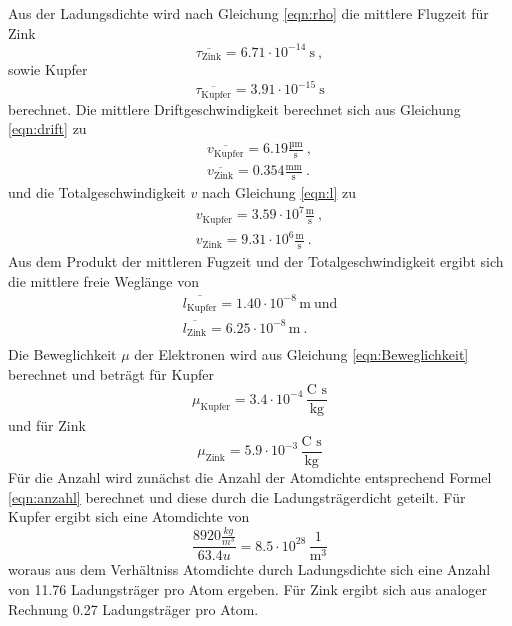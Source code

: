 Aus der Ladungsdichte wird nach Gleichung \ref{eqn:rho} die mittlere Flugzeit für Zink
\begin{equation}
  \overline{\tau_\text{Zink}} = 6.71 \cdot 10^{-14} \ \text{s} \ ,
  \label{eqn:tZ}
\end{equation}
sowie Kupfer
\begin{equation}
  \overline{\tau_\text{Kupfer}} = 3.91 \cdot 10^{-15} \ \text{s}
    \label{eqn:tK}
\end{equation}
berechnet. Die mittlere Driftgeschwindigkeit berechnet sich aus Gleichung \ref{eqn:drift} zu
\begin{eqnarray}
  \overline{v_\text{Kupfer}} = 6.19 \frac{\text{µm}}{\text{s}} \ , \\
  \overline{v_\text{Zink}} = 0.354 \frac{\text{mm}}{\text{s}} \ .
\end{eqnarray}
und die Totalgeschwindigkeit $v$ nach Gleichung \ref{eqn:l} zu
\begin{eqnarray}
  v_\text{Kupfer} = 3.59 \cdot 10^7 \frac{\text{m}}{\text{s}} \ , \\
  v_\text{Zink} = 9.31 \cdot 10^6 \frac{\text{m}}{\text{s}} \ .
\end{eqnarray}
Aus dem Produkt der mittleren Fugzeit und der Totalgeschwindigkeit ergibt sich die mittlere freie Weglänge von
\begin{eqnarray}
  \overline{l_\text{Kupfer}} = 1.40 \cdot 10^{-8} \, \text{m} \ \text{und} \\
  \overline{l_\text{Zink}} = 6.25 \cdot 10^{-8} \, \text{m} \ .\\
\end{eqnarray}
Die Beweglichkeit $\mu$ der Elektronen wird aus Gleichung \ref{eqn:Beweglichkeit} berechnet und beträgt für Kupfer
\begin{equation}
  \mu_\text{Kupfer} = 3.4 \cdot 10^{-4} \, \frac{\text{C s}}{\text{kg}}
\end{equation}
und für Zink
\begin{equation}
  \mu_\text{Zink} = 5.9 \cdot 10^{-3} \, \frac{\text{C s}}{\text{kg}}
\end{equation}
Für die Anzahl wird zunächst die Anzahl der Atomdichte entsprechend Formel \ref{eqn:anzahl} berechnet und diese durch die Ladungsträgerdicht geteilt. Für Kupfer ergibt sich eine Atomdichte von
\begin{equation}
  \frac{8920 \frac{kg}{m^3}}{63.4 u} = 8.5 \cdot 10^{28} \, \frac{1}{\text{m}^3}
\end{equation}
woraus aus dem Verhältniss Atomdichte durch Ladungsdichte sich eine Anzahl von 11.76 Ladungsträger pro Atom ergeben. Für Zink ergibt sich aus analoger Rechnung 0.27 Ladungsträger pro Atom.

